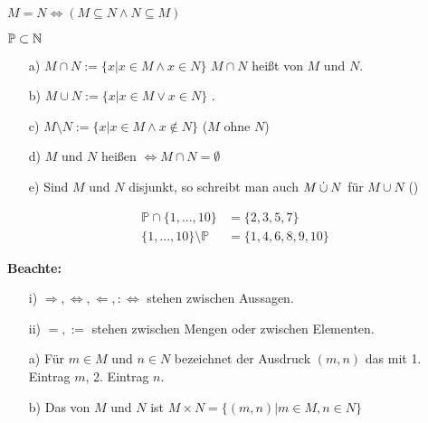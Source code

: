 \begin{ub}
	$M=N\Leftrightarrow(M\subseteq N\wedge N\subseteq M)$
\end{ub}

\begin{bsp}
	$\mathbb{P}\subset\mathbb{N}$
\end{bsp}

\begin{defi}
	\begin{itemize}
		\item[]
		\item[a)] $M\cap N:=\{x|x\in M\wedge x\in N\}$ $M\cap N$ heißt  von $M$ und $N$.
		\item[b)] $M\cup N:=\{x|x\in M\vee x\in N\}$ .
		\item[c)] $M\setminus N:=\{x|x\in M\wedge x\notin N\}$  ($M$ ohne $N$)
		\item[d)] $M$ und $N$ heißen $\Leftrightarrow M\cap N=\emptyset$
		\item[e)] Sind $M$ und $N$ disjunkt, so schreibt man auch $M\mathbin{\dot{\cup}} N$ für $M\cup N$ ()
	\end{itemize}
\end{defi}

\begin{bsp}
	\begin{align*}
	\mathbb{P}\cap\{1,...,10\}&=\{2,3,5,7\} \\
	\{1,...,10\}\setminus\mathbb{P}&=\{1,4,6,8,9,10\}
	\end{align*}
\end{bsp}

\noindent\textbf{Beachte:}
\begin{itemize}
	\item[i)] $\Rightarrow,\Leftrightarrow,\Leftarrow,:\Leftrightarrow$ stehen zwischen Aussagen.
	\item[ii)] $=,:=$ stehen zwischen Mengen oder zwischen Elementen.
\end{itemize}

\begin{defi}
	\begin{itemize}
		\item[]
		\item[a)] Für $m\in M$ und $n\in N$ bezeichnet der Ausdruck $(m,n)$ das  mit 1. Eintrag $m$, 2. Eintrag $n$.
		\item[b)] Das  von $M$ und $N$ ist $M\times N=\{(m,n)|m\in M,n\in N\}$
	\end{itemize}
\end{defi}

